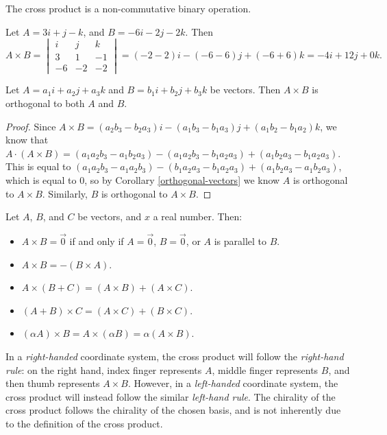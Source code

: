 \begin{rmk}
    The cross product is a non-commutative binary operation.
\end{rmk}

\begin{exmp}
    Let $A = 3i + j - k$, and $B = -6i - 2j - 2k$. Then \[A \times B =
    \begin{vmatrix}
        i & j & k \\ 3 & 1 & -1 \\ -6 & -2 & -2
    \end{vmatrix} = (-2 - 2)i - (-6 - 6)j + (-6 + 6)k = -4i + 12j + 0k.\]
\end{exmp}

\begin{thm}
    Let $A = a_1i + a_2j + a_3k$ and $B = b_1i + b_2j + b_3k$ be vectors. Then $A \times B$ is orthogonal to both $A$ and $B$.
\end{thm}

\begin{proof}
    Since $A \times B = (a_2b_3 - b_2a_3)i - (a_1b_3 - b_1a_3)j + (a_1b_2 - b_1a_2)k$, we know that $A \cdot (A \times B) = (a_1a_2b_3 - a_1b_2a_3) - (a_1a_2b_3 - b_1a_2a_3) + (a_1b_2a_3 - b_1a_2a_3)$. This is equal to $(a_1a_2b_3 - a_1a_2b_3) - (b_1a_2a_3 - b_1a_2a_3) + (a_1b_2a_3 - a_1b_2a_3)$, which is equal to $0$, so by Corollary \ref{orthogonal-vectors} we know $A$ is orthogonal to $A \times B$. Similarly, $B$ is orthogonal to $A \times B$.
\end{proof}

\begin{thm}
    Let $A$, $B$, and $C$ be vectors, and $x$ a real number. Then:
    \begin{itemize}
        \item $A \times B = \vec{0}$ if and only if $A = \vec{0}$, $B = \vec{0}$, or $A$ is parallel to $B$.
        \item $A \times B = -(B \times A)$.
        \item $A \times (B + C) = (A \times B) + (A \times C)$.
        \item $(A + B) \times C = (A \times C) + (B \times C)$.
        \item $(\alpha A) \times B = A \times (\alpha B) = \alpha(A \times B)$.
    \end{itemize}
\end{thm}

\begin{rmk}
    In a \emph{right-handed} coordinate system, the cross product will follow the \emph{right-hand rule}: on the right hand, index finger represents $A$, middle finger represents $B$, and then thumb represents $A \times B$. However, in a \emph{left-handed} coordinate system, the cross product will instead follow the similar \emph{left-hand rule}. The chirality of the cross product follows the chirality of the chosen basis, and is not inherently due to the definition of the cross product.
\end{rmk}

